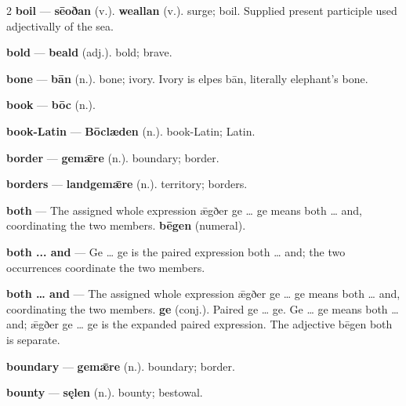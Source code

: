 \begin{multicols}{2}
\textbf{boil} — \textbf{sēoðan} (v.).  \textbf{weallan} (v.). surge; boil. Supplied present participle used adjectivally of the sea.\par
\textbf{bold} — \textbf{beald} (adj.). bold; brave.\par
\textbf{bone} — \textbf{bān} (n.). bone; ivory. Ivory is elpes bān, literally elephant's bone.\par
\textbf{book} — \textbf{bōc} (n.).\par
\textbf{book-Latin} — \textbf{Bōclæden} (n.). book-Latin; Latin.\par
\textbf{border} — \textbf{gemǣre} (n.). boundary; border.\par
\textbf{borders} — \textbf{landgemǣre} (n.). territory; borders.\par
\textbf{both} — The assigned whole expression ǣgðer ge … ge means both … and, coordinating the two members. \textbf{bēgen} (numeral).\par
\textbf{both ... and} — Ge … ge is the paired expression both … and; the two occurrences coordinate the two members.\par
\textbf{both … and} — The assigned whole expression ǣgðer ge … ge means both … and, coordinating the two members. \textbf{ge} (conj.). Paired ge … ge. Ge … ge means both … and; ǣgðer ge … ge is the expanded paired expression. The adjective bēgen both is separate.\par
\textbf{boundary} — \textbf{gemǣre} (n.). boundary; border.\par
\textbf{bounty} — \textbf{sęlen} (n.). bounty; bestowal.\par

\end{multicols}
